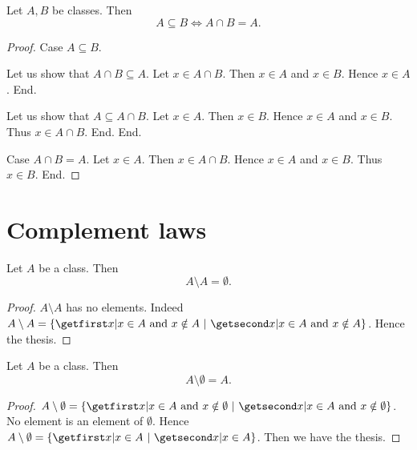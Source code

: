 \documentclass[../set-theory.tex]{subfiles}
\begin{document}
  \begin{forthel}
    \begin{proposition}
      Let $A, B$ be classes.
      Then \[ A \subseteq B \iff A \cap B = A. \]
    \end{proposition}
    \begin{proof}
      Case $A \subseteq B$.

        Let us show that $A \cap B \subseteq A$.
          Let $x \in A \cap B$.
          Then $x \in A$ and $x \in B$.
          Hence $x \in A$.
        End.

        Let us show that $A \subseteq A \cap B$.
          Let $x \in A$.
          Then $x \in B$.
          Hence $x \in A$ and $x \in B$.
          Thus $x \in A \cap B$.
        End.
      End.

      Case $A \cap B = A$.
        Let $x \in A$.
        Then $x \in A \cap B$.
        Hence $x \in A$ and $x \in B$.
        Thus $x \in B$.
      End.
    \end{proof}
  \end{forthel}


  \section*{Complement laws}

  \begin{forthel}
    \begin{proposition}
      Let $A$ be a class.
      Then \[ A \setminus A = \emptyset. \]
    \end{proposition}
    \begin{proof}
      $A \setminus A$ has no elements.
      Indeed $A \setminus A = \class{ x | \text{$x \in A$ and $x \notin A$} }$.
      Hence the thesis.
    \end{proof}
  \end{forthel}

  \begin{forthel}
    \begin{proposition}
      Let $A$ be a class.
      Then \[ A \setminus \emptyset = A. \]
    \end{proposition}
    \begin{proof}
      $A \setminus \emptyset = \class{ x | \text{$x \in A$ and $x \notin \emptyset$} }$.
      No element is an element of $\emptyset$.
      Hence $A \setminus \emptyset = \class{ x | x \in A }$.
      Then we have the thesis.
    \end{proof}
  \end{forthel}
\end{document}
